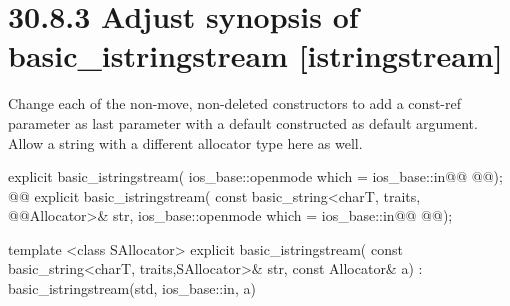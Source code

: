 \documentclass[ebook,11pt,article]{memoir}
\begin{document}
\section{30.8.3 Adjust synopsis of basic\_istringstream [istringstream]}
Change each of the non-move, non-deleted constructors to add a const-ref  parameter as last parameter with a default constructed  as default argument. Allow a string with a different allocator type here as well.
\begin{codeblock}
explicit basic_istringstream(
             ios_base::openmode which = ios_base::in@\added{,}@
             @@);
@@
explicit basic_istringstream(
             const basic_string<charT, traits, @@Allocator>& str,
             ios_base::openmode which = ios_base::in@\added{,}@
             @@);
\end{codeblock}
\begin{addedblock}\begin{codeblock}
template <class SAllocator>
explicit basic_istringstream(
             const basic_string<charT, traits,SAllocator>& str,
             const Allocator& a)
         : basic_istringstream(std, ios_base::in, a) {}
\end{codeblock}\end{addedblock}


%
\end{document}
